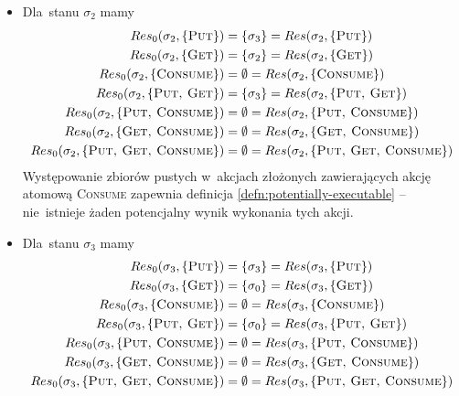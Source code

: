 \documentclass[11pt,a4paper]{article}
\begin{document}
\begin{itemize}
    \item Dla~stanu $\sigma_2$ mamy
    \begin{align*}
        Res_0(\sigma_2, \{ \textsc{Put} \}) &= \{ \sigma_3 \} = Res(\sigma_2, \{ \textsc{Put} \}) \\
        Res_0(\sigma_2, \{ \textsc{Get} \}) &= \{ \sigma_2 \} = Res(\sigma_2, \{ \textsc{Get} \}) \\
        Res_0(\sigma_2, \{ \textsc{Consume} \}) &= \emptyset = Res(\sigma_2, \{ \textsc{Consume} \}) \\
        Res_0(\sigma_2, \{ \textsc{Put, Get} \}) &= \{ \sigma_3 \} = Res(\sigma_2, \{ \textsc{Put, Get} \}) \\
        Res_0(\sigma_2, \{ \textsc{Put, Consume} \}) &= \emptyset = Res(\sigma_2, \{ \textsc{Put, Consume} \}) \\
        Res_0(\sigma_2, \{ \textsc{Get, Consume} \}) &= \emptyset = Res(\sigma_2, \{ \textsc{Get, Consume} \}) \\
        Res_0(\sigma_2, \{ \textsc{Put, Get, Consume} \}) &= \emptyset = Res(\sigma_2, \{ \textsc{Put, Get, Consume} \})
    \end{align*}
    Występowanie zbiorów pustych w~akcjach złożonych zawierających akcję atomową \textsc{Consume} zapewnia definicja \ref{defn:potentially-executable} -- nie~istnieje żaden potencjalny wynik wykonania tych akcji.

    \item Dla~stanu $\sigma_3$ mamy
    \begin{align*}
        Res_0(\sigma_3, \{ \textsc{Put} \}) &= \{ \sigma_3 \} = Res(\sigma_3, \{ \textsc{Put} \}) \\
        Res_0(\sigma_3, \{ \textsc{Get} \}) &= \{ \sigma_0 \} = Res(\sigma_3, \{ \textsc{Get} \}) \\
        Res_0(\sigma_3, \{ \textsc{Consume} \}) &= \emptyset = Res(\sigma_3, \{ \textsc{Consume} \}) \\
        Res_0(\sigma_3, \{ \textsc{Put, Get} \}) &= \{ \sigma_0 \} = Res(\sigma_3, \{ \textsc{Put, Get} \}) \\
        Res_0(\sigma_3, \{ \textsc{Put, Consume} \}) &= \emptyset = Res(\sigma_3, \{ \textsc{Put, Consume} \}) \\
        Res_0(\sigma_3, \{ \textsc{Get, Consume} \}) &= \emptyset = Res(\sigma_3, \{ \textsc{Get, Consume} \}) \\
        Res_0(\sigma_3, \{ \textsc{Put, Get, Consume} \}) &= \emptyset = Res(\sigma_3, \{ \textsc{Put, Get, Consume} \})
    \end{align*}
\end{itemize}
\end{document}
